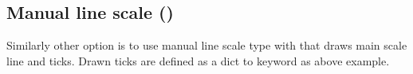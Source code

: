 \documentclass[a4paper,11pt,english]{sphinxmanual}
\begin{document}
\subsection{Manual line scale ()}
\label{\detokenize{axes/axes:manual-line-scale-scale-type-manual-line}}
Similarly other option is to use manual line scale type with  that draws main scale line
and ticks. Drawn ticks are defined as a dict to keyword  as above example.

\begin{sphinxVerbatim}[commandchars=\\\{\},numbers=left,firstnumber=1,stepnumber=1,formatcom=\scriptsize]


\end{sphinxVerbatim}
\end{document}
